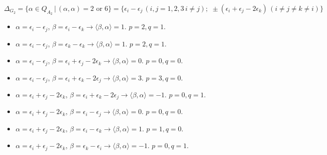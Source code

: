 \documentclass[11pt]{article}
\newenvironment{solution}[1][Solution]{\begin{trivlist}
\item[\hskip \labelsep {\bfseries #1}]}{\end{trivlist}}
\begin{document}
\begin{solution}
$\Delta_{G_2} = \{ \alpha \in Q_{A_2} \, | \, (\alpha,\alpha) = 2
\mbox{ or } 6 \} = \{ \epsilon_i - \epsilon_j \, (i,j=1,2,3 \, i
\not = j); \,\, \pm (\epsilon_i + \epsilon_j - 2\epsilon_k) \, (i
\not = j \not = k \not = i) \}$

\begin{itemize}
\item $\alpha = \epsilon_i - \epsilon_j$, $\beta = \epsilon_i -
\epsilon_k \rightarrow \langle \beta , \alpha \rangle = 1$.  $p=2,
q=1$.

\item $\alpha = \epsilon_i - \epsilon_j$, $\beta = \epsilon_k -
\epsilon_k \rightarrow \langle \beta , \alpha \rangle = 1$.  $p=2,
q=1$.

\item $\alpha = \epsilon_i - \epsilon_j$, $\beta = \epsilon_i +
\epsilon_j - 2\epsilon_k \rightarrow \langle \beta , \alpha
\rangle = 0$. $p=0, q=0$.

\item $\alpha = \epsilon_i - \epsilon_j$, $\beta = \epsilon_i +
\epsilon_k - 2\epsilon_j \rightarrow \langle \beta , \alpha
\rangle = 3$. $p=3, q=0$.

\item $\alpha = \epsilon_i + \epsilon_j - 2\epsilon_k$, $\beta =
\epsilon_i + \epsilon_k - 2\epsilon_j \rightarrow \langle \beta ,
\alpha \rangle = -1$. $p=0, q=1$.

\item $\alpha = \epsilon_i + \epsilon_j - 2\epsilon_k$, $\beta =
\epsilon_i - \epsilon_j \rightarrow \langle \beta , \alpha \rangle
= 0$. $p=0, q=0$.

\item $\alpha = \epsilon_i + \epsilon_j - 2\epsilon_k$, $\beta =
\epsilon_i - \epsilon_k \rightarrow \langle \beta , \alpha \rangle
= 1$. $p=1, q=0$.

\item $\alpha = \epsilon_i + \epsilon_j -2 \epsilon_k$, $\beta =
\epsilon_k - \epsilon_i \rightarrow \langle \beta , \alpha \rangle
= -1$. $p=0, q=1$.

\end{itemize}
\end{solution}
\end{document}
